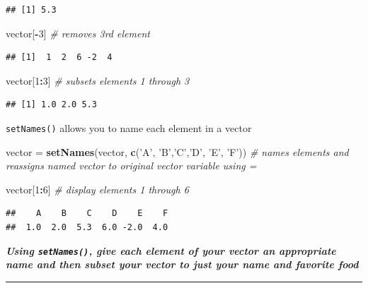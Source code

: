 \documentclass[
]{article}
\newenvironment{Shaded}{\begin{snugshade}}{\end{snugshade}}
\newcommand{\CommentTok}[1]{\textcolor[rgb]{0.56,0.35,0.01}{\textit{#1}}}
\newcommand{\DecValTok}[1]{\textcolor[rgb]{0.00,0.00,0.81}{#1}}
\newcommand{\KeywordTok}[1]{\textcolor[rgb]{0.13,0.29,0.53}{\textbf{#1}}}
\newcommand{\NormalTok}[1]{#1}
\newcommand{\OperatorTok}[1]{\textcolor[rgb]{0.81,0.36,0.00}{\textbf{#1}}}
\newcommand{\StringTok}[1]{\textcolor[rgb]{0.31,0.60,0.02}{#1}}
\begin{document}
\begin{verbatim}
## [1] 5.3
\end{verbatim}

\begin{Shaded}
\begin{Highlighting}[]
\NormalTok{vector[}\OperatorTok{-}\DecValTok{3}\NormalTok{] }\CommentTok{# removes 3rd element}
\end{Highlighting}
\end{Shaded}

\begin{verbatim}
## [1]  1  2  6 -2  4
\end{verbatim}

\begin{Shaded}
\begin{Highlighting}[]
\NormalTok{vector[}\DecValTok{1}\OperatorTok{:}\DecValTok{3}\NormalTok{] }\CommentTok{# subsets elements 1 through 3}
\end{Highlighting}
\end{Shaded}

\begin{verbatim}
## [1] 1.0 2.0 5.3
\end{verbatim}

\texttt{setNames()} allows you to name each element in a vector

\begin{Shaded}
\begin{Highlighting}[]
\NormalTok{vector =}\StringTok{ }\KeywordTok{setNames}\NormalTok{(vector, }\KeywordTok{c}\NormalTok{(}\StringTok{'A'}\NormalTok{, }\StringTok{'B'}\NormalTok{,}\StringTok{'C'}\NormalTok{,}\StringTok{'D'}\NormalTok{, }\StringTok{'E'}\NormalTok{, }\StringTok{'F'}\NormalTok{)) }\CommentTok{# names elements and reassigns named vector to original vector variable using =}

\NormalTok{vector[}\DecValTok{1}\OperatorTok{:}\DecValTok{6}\NormalTok{] }\CommentTok{# display elements 1 through 6}
\end{Highlighting}
\end{Shaded}

\begin{verbatim}
##    A    B    C    D    E    F 
##  1.0  2.0  5.3  6.0 -2.0  4.0
\end{verbatim}

\textbf{\emph{Using \texttt{setNames()}, give each element of your
vector an appropriate name and then subset your vector to just your name
and favorite food}}

\begin{center}\rule{0.5\linewidth}{0.5pt}\end{center}
\end{document}
